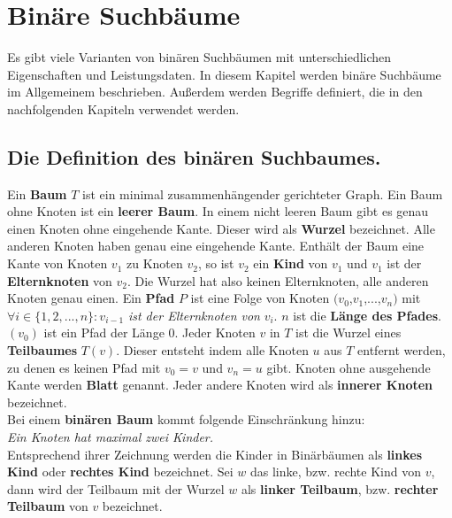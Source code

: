 \documentclass[a4paper,12pt]{article}
\begin{document}
\newpage
\section {Binäre Suchbäume}
Es gibt viele Varianten von binären Suchbäumen mit unterschiedlichen Eigenschaften und Leistungsdaten. In diesem Kapitel werden binäre Suchbäume im Allgemeinem beschrieben. Außerdem werden Begriffe definiert, die in den nachfolgenden Kapiteln verwendet werden. \\
\subsection {Die Definition des  binären Suchbaumes.}
Ein \textbf{Baum} $T$ ist ein minimal zusammenhängender gerichteter Graph. Ein Baum ohne Knoten ist ein \textbf{leerer Baum}. In einem nicht leeren Baum gibt es genau einen Knoten ohne eingehende Kante. Dieser wird als \textbf{Wurzel}  bezeichnet. Alle anderen Knoten haben genau eine eingehende Kante.  Enthält der Baum eine Kante von Knoten $v_1$ zu Knoten $v_2$, so ist $v_2$ ein \textbf{Kind} von $v_1$ und $v_1$ ist der  \textbf{Elternknoten} von $v_2$. Die Wurzel hat also keinen Elternknoten, alle anderen Knoten genau einen.  Ein \textbf{Pfad} $P$ ist eine Folge von Knoten $(v_0$,$v_1$,...,$v_n)$ mit $\forall i \in \{ 1, 2,..., n \} \colon v_{i-1}$ \textit{ist der Elternknoten von} $v_i$. $n$ ist die \textbf{Länge des Pfades}. $\left(v_0\right)$ ist ein Pfad der Länge $0$. Jeder Knoten $v$ in $T$ ist die Wurzel eines \textbf{Teilbaumes} $T(v)$. Dieser entsteht indem alle Knoten $u$ aus $T$ entfernt werden, zu denen es keinen Pfad mit  $v_0 = v$ und $v_n = u$ gibt. Knoten ohne ausgehende Kante werden \textbf{Blatt} genannt. Jeder andere Knoten wird als \textbf{innerer Knoten} bezeichnet.\\
Bei einem \textbf{binären Baum} kommt folgende Einschränkung hinzu:  \\
\textit{Ein Knoten hat maximal zwei Kinder.}\\ 
Entsprechend ihrer Zeichnung werden die Kinder in Binärbäumen als \textbf{linkes Kind} oder \textbf{rechtes Kind} bezeichnet. Sei $w$ das linke, bzw. rechte Kind von $v$, dann wird der Teilbaum mit der Wurzel $w$ als \textbf{linker Teilbaum}, bzw. \textbf{rechter Teilbaum}  von $v$ bezeichnet.  
\end{document}
